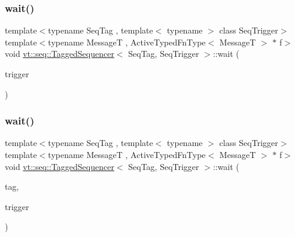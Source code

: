 \mbox{\label{structvt_1_1seq_1_1_tagged_sequencer_a9a1be66a0b4667009824bbfbf9a5f7d1}} 
\subsubsection{\texorpdfstring{wait()}{wait()}\hspace{0.1cm}{\footnotesize\ttfamily [1/2]}}
{\footnotesize\ttfamily template$<$typename Seq\+Tag , template$<$ typename $>$ class Seq\+Trigger$>$ \\
template$<$typename MessageT , Active\+Typed\+Fn\+Type$<$ Message\+T $>$ $\ast$ f$>$ \\
void \hyperlink{structvt_1_1seq_1_1_tagged_sequencer}{vt\+::seq\+::\+Tagged\+Sequencer}$<$ Seq\+Tag, Seq\+Trigger $>$\+::wait (\begin{DoxyParamCaption}\item[{\hyperlink{structvt_1_1seq_1_1_tagged_sequencer_a4b015f2f7d3197a66af5576f0e63a834}{Seq\+Trigger\+Type}$<$ MessageT $>$}]{trigger }\end{DoxyParamCaption})}

\mbox{\label{structvt_1_1seq_1_1_tagged_sequencer_a8c96cc7cc925cfd95b0e90d5e29b2211}} 
\subsubsection{\texorpdfstring{wait()}{wait()}\hspace{0.1cm}{\footnotesize\ttfamily [2/2]}}
{\footnotesize\ttfamily template$<$typename Seq\+Tag , template$<$ typename $>$ class Seq\+Trigger$>$ \\
template$<$typename MessageT , Active\+Typed\+Fn\+Type$<$ Message\+T $>$ $\ast$ f$>$ \\
void \hyperlink{structvt_1_1seq_1_1_tagged_sequencer}{vt\+::seq\+::\+Tagged\+Sequencer}$<$ Seq\+Tag, Seq\+Trigger $>$\+::wait (\begin{DoxyParamCaption}\item[{\hyperlink{namespacevt_a84ab281dae04a52a4b243d6bf62d0e52}{Tag\+Type} const \&}]{tag,  }\item[{\hyperlink{structvt_1_1seq_1_1_tagged_sequencer_a4b015f2f7d3197a66af5576f0e63a834}{Seq\+Trigger\+Type}$<$ MessageT $>$}]{trigger }\end{DoxyParamCaption})}

